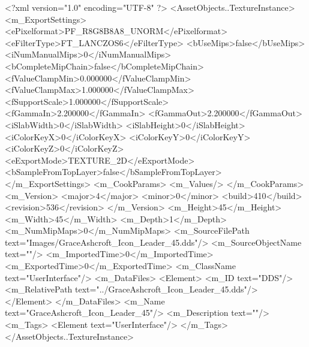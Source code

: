 <?xml version="1.0" encoding="UTF-8" ?>
<AssetObjects..TextureInstance>
	<m_ExportSettings>
		<ePixelformat>PF_R8G8B8A8_UNORM</ePixelformat>
		<eFilterType>FT_LANCZOS6</eFilterType>
		<bUseMips>false</bUseMips>
		<iNumManualMips>0</iNumManualMips>
		<bCompleteMipChain>false</bCompleteMipChain>
		<fValueClampMin>0.000000</fValueClampMin>
		<fValueClampMax>1.000000</fValueClampMax>
		<fSupportScale>1.000000</fSupportScale>
		<fGammaIn>2.200000</fGammaIn>
		<fGammaOut>2.200000</fGammaOut>
		<iSlabWidth>0</iSlabWidth>
		<iSlabHeight>0</iSlabHeight>
		<iColorKeyX>0</iColorKeyX>
		<iColorKeyY>0</iColorKeyY>
		<iColorKeyZ>0</iColorKeyZ>
		<eExportMode>TEXTURE_2D</eExportMode>
		<bSampleFromTopLayer>false</bSampleFromTopLayer>
	</m_ExportSettings>
	<m_CookParams>
		<m_Values/>
	</m_CookParams>
	<m_Version>
		<major>4</major>
		<minor>0</minor>
		<build>410</build>
		<revision>536</revision>
	</m_Version>
	<m_Height>45</m_Height>
	<m_Width>45</m_Width>
	<m_Depth>1</m_Depth>
	<m_NumMipMaps>0</m_NumMipMaps>
	<m_SourceFilePath text="Images/GraceAshcroft_Icon_Leader_45.dds"/>
	<m_SourceObjectName text=""/>
	<m_ImportedTime>0</m_ImportedTime>
	<m_ExportedTime>0</m_ExportedTime>
	<m_ClassName text="UserInterface"/>
	<m_DataFiles>
		<Element>
			<m_ID text="DDS"/>
			<m_RelativePath text="../GraceAshcroft_Icon_Leader_45.dds"/>
		</Element>
	</m_DataFiles>
	<m_Name text="GraceAshcroft_Icon_Leader_45"/>
	<m_Description text=""/>
	<m_Tags>
		<Element text="UserInterface"/>
	</m_Tags>
</AssetObjects..TextureInstance>
